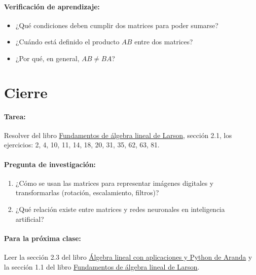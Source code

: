 \documentclass[a4,11pt]{aleph-notas}
\begin{document}
\paragraph{Verificación de aprendizaje:}  
\begin{itemize}[leftmargin=*]  
    \item ¿Qué condiciones deben cumplir dos matrices para poder sumarse?  
    \item ¿Cuándo está definido el producto $AB$ entre dos matrices?  
    \item ¿Por qué, en general, $AB \neq BA$?  
\end{itemize}  

\section*{Cierre}  

\paragraph{Tarea:}  
Resolver del libro \href{https://catalogobiblioteca.puce.edu.ec/cgi-bin/koha/opac-detail.pl?biblionumber=86081}{Fundamentos de álgebra lineal de Larson}, sección 2.1, los ejercicios: 2, 4, 10, 11, 14, 18, 20, 31, 35, 62, 63, 81.

\paragraph{Pregunta de investigación:}  
\begin{enumerate}[leftmargin=*]  
    \item ¿Cómo se usan las matrices para representar imágenes digitales y transformarlas (rotación, escalamiento, filtros)?
    \item ¿Qué relación existe entre matrices y redes neuronales en inteligencia artificial?
\end{enumerate}  

\paragraph{Para la próxima clase:}  
Leer la sección 2.3 del libro \href{https://catalogobiblioteca.puce.edu.ec/cgi-bin/koha/opac-detail.pl?biblionumber=283260}{Álgebra lineal con aplicaciones y Python de Aranda} y la sección 1.1 del libro \href{https://catalogobiblioteca.puce.edu.ec/cgi-bin/koha/opac-detail.pl?biblionumber=86081}{Fundamentos de álgebra lineal de Larson}.
\end{document}
